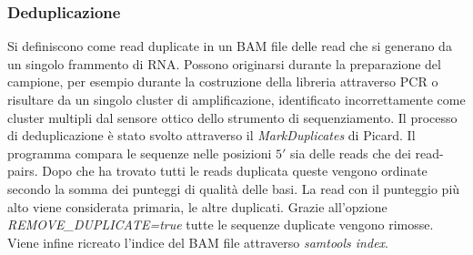     \subsubsection{Deduplicazione}
    Si definiscono come read duplicate in un BAM file delle read che si generano da un singolo frammento di RNA.
    Possono originarsi durante la preparazione del campione, per esempio durante la costruzione della libreria attraverso PCR o risultare da un singolo cluster di amplificazione, identificato incorrettamente come cluster multipli dal sensore ottico dello strumento di sequenziamento.
    Il processo di deduplicazione \`e stato svolto attraverso il \emph{MarkDuplicates} di Picard.
    Il programma compara le sequenze nelle posizioni $5'$ sia delle reads che dei read-pairs.
    Dopo che ha trovato tutti le reads duplicata queste vengono ordinate secondo la somma dei punteggi di qualit\`a delle basi.
    La read con il punteggio pi\`u alto viene considerata primaria, le altre duplicati.
    Grazie all'opzione \emph{REMOVE\_DUPLICATE=true} tutte le sequenze duplicate vengono rimosse.
    Viene infine ricreato l'indice del BAM file attraverso \emph{samtools index}.

